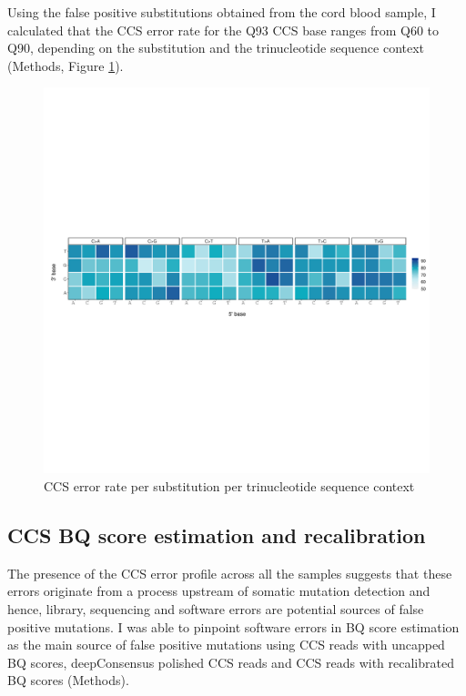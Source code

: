 Using the false positive substitutions obtained from the cord blood sample, I calculated that the CCS error rate for the Q93 CCS base ranges from Q60 to Q90, depending on the substitution and the trinucleotide sequence context (Methods, Figure \ref{figure:ccs-error-rate-per-substiution-per-trinucleotide-sequence-context}).

\begin{figure}[htbp!]
\caption{CCS error rate per substitution per trinucleotide sequence context}
\label{figure:ccs-error-rate-per-substiution-per-trinucleotide-sequence-context}
\includegraphics[width=\textwidth]{Vector/ccs_error_rate.pdf}
\end{figure}


\subsection{CCS BQ score estimation and recalibration} 

The presence of the CCS error profile across all the samples suggests that these errors originate from a process upstream of somatic mutation detection and hence, library, sequencing and software errors are potential sources of false positive mutations. I was able to pinpoint software errors in BQ score estimation as the main source of false positive mutations using CCS reads with uncapped BQ scores, deepConsensus polished CCS reads and CCS reads with recalibrated BQ scores (Methods). 

